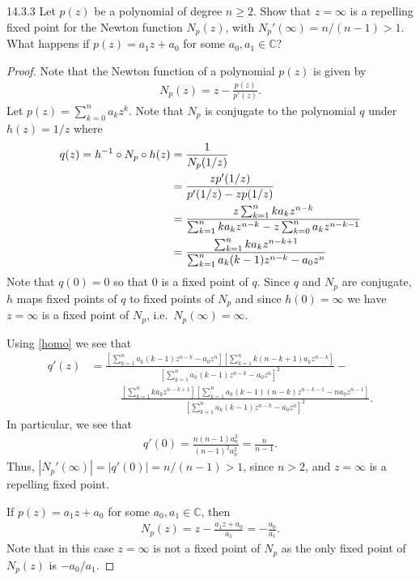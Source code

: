 \begin{problem}{14.3.3}
  Let $p(z)$ be a polynomial of degree $n \geq 2$. Show that $z=\infty$ is a repelling
  fixed point for the Newton function $N_p(z)$, with $N_p'(\infty) = n/(n-1) > 1$. What
  happens if $p(z) = a_1 z + a_0$ for some $a_0, a_1 \in\mathbb{C}$?
\end{problem}

\begin{proof}
  Note that the Newton function of a polynomial $p(z)$ is given by
  \begin{align*}
    N_p(z) = z - \frac{p(z)}{p'(z)}.
  \end{align*}
  Let $p(z) = \sum_{k=0}^n a_k z^k$.
  Note that $N_p$ is conjugate to the polynomial $q$ under $h(z) = 1/z$ where
  \begin{align}\label{homo}
    q(z) = h^{-1} \circ N_p \circ h(z) &= \frac{1}{N_p(1/z)} \notag \\
    &= \frac{zp'(1/z)}{p'(1/z)-zp(1/z)} \notag \\
    &= \frac{z\sum_{k=1}^{n} k a_k z^{n-k}}{\sum_{k=1}^{n} k a_k z^{n-k} -z\sum_{k=0}^{n} a_k z^{n-k-1}} \notag \\
    &= \frac{\sum_{k=1}^{n} k a_k z^{n-k+1}}{\sum_{k=1}^{n} a_k(k-1) z^{n-k} -a_0 z^n}
  \end{align}
  Note that $q(0) = 0$ so that 0 is a fixed point of $q$. Since $q$ and $N_p$ are conjugate,
  $h$ maps fixed points of $q$ to fixed points of $N_p$ and since $h(0) = \infty$
  we have $z=\infty$ is a fixed point of $N_p$, i.e.\ $N_p(\infty) = \infty$.

  Using \eqref{homo} we see that
  \begin{align*}
    q'(z) &= \frac{\left[\sum_{k=1}^{n} a_k(k-1) z^{n-k} -a_0 z^n\right]\left[\sum_{k=1}^{n} k (n-k+1) a_k z^{n-k}\right]}{\left[\sum_{k=1}^{n} a_k(k-1) z^{n-k} -a_0 z^n\right]^2} - \\
          &\phantom{==} \frac{\left[\sum_{k=1}^{n} k a_k z^{n-k+1}\right]\left[\sum_{k=1}^{n} a_k(k-1)(n-k) z^{n-k-1} -n a_0 z^{n-1}\right]}{\left[\sum_{k=1}^{n} a_k(k-1) z^{n-k} -a_0 z^n\right]^2}.
  \end{align*}
  In particular, we see that
  \begin{align*}
    q'(0) = \frac{n(n-1)a_n^2}{(n-1)^2 a_n^2} = \frac{n}{n-1}.
  \end{align*}
  Thus, $|N_p'(\infty)| = |q'(0)| = n/(n-1) > 1$, since $n > 2$, and $z=\infty$ is a repelling fixed point.

  If $p(z) = a_1 z + a_0$ for some $a_0, a_1 \in \mathbb{C}$, then
  \begin{align*}
    N_p(z) = z - \frac{a_1 z + a_0}{a_1} = -\frac{a_0}{a_1}.
  \end{align*}
  Note that in this case $z=\infty$ is not a fixed point of $N_p$ as the only fixed point of $N_p(z)$ is
  $-a_0/a_1$.
\end{proof}
\newpage
